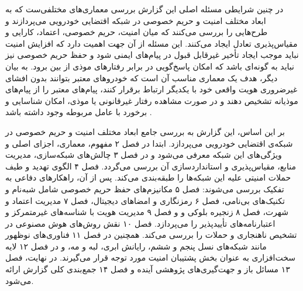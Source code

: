 در چنین شرایطی مسئله اصلی این گزارش بررسی معماری‌های مختلفی‌ست که به ابعاد مختلف امنیت و حریم خصوصی در شبکه اقتضایی خودرویی می‌پردازند و طرح‌هایی را بررسی می‌کنند که میان امنیت، حریم خصوصی، اعتماد، کارایی و مقیاس‌پذیری تعادل ایجاد می‌کنند. این مسئله از آن جهت اهمیت دارد که افزایش امنیت نباید موجب ایجاد تأخیر غیرقابل قبول در پیام‌های ایمنی شود و حفظ حریم خصوصی نیز نباید به گونه‌ای باشد که امکان پاسخ‌گویی در برابر رفتارهای موذی از بین برود. به بیان دیگر، هدف یک معماری مناسب آن است که خودروهای معتبر بتوانند بدون افشای غیرضروری هویت واقعی خود با یکدیگر ارتباط برقرار کنند، پیام‌های معتبر را از پیام‌های موذیانه تشخیص دهند و در صورت مشاهده رفتار غیرقانونی یا موذی، امکان شناسایی و برخورد با عامل مربوطه وجود داشته باشد \cite{rahmawatiagustinaSystematicLiteratureReview2025,VanetSecurityPrivacy}.

بر این اساس، این گزارش به بررسی جامع ابعاد مختلف امنیت و حریم خصوصی در شبکه‌ی اقتضایی خودرویی می‌پردازد. ابتدا در فصل ۲ مفهوم، معماری، اجزای اصلی و ویژگی‌های این شبکه معرفی می‌شود و در فصل ۳ چالش‌های شبکه‌سازی، مدیریت منابع، مقیاس‌پذیری و استانداردسازی آن بررسی می‌گردد. فصل ۴ الگوی تهدید و طیف حملات امنیتی علیه این شبکه‌ها را طبقه‌بندی می‌کند. پس از آن، راهکارهای دفاعی به تفکیک بررسی می‌شوند: فصل ۵ مکانیزم‌های حفظ حریم خصوصی شامل شبه‌نام و تکنیک‌های بی‌نامی، فصل ۶ رمزنگاری و امضاهای دیجیتال، فصل ۷ مدیریت اعتماد و شهرت، فصل ۸ زنجیره بلوکی و  و فصل ۹ مدیریت هویت با شناسه‌های غیرمتمرکز و اعتبارنامه‌های تأییدپذیر را می‌پردازد. فصل ۱۰ نقش روش‌های هوش مصنوعی در تشخیص ناهنجاری و حملات را بررسی می‌کند. همچنین در فصل ۱۱ فناوری‌های نوظهور مانند شبکه‌های نسل پنجم و ششم، رایانش ابری، لبه و مه، و در فصل ۱۲ لایه سخت‌افزاری به عنوان بخش پشتیبان امنیت مورد توجه قرار می‌گیرند. در نهایت، فصل ۱۳ مسائل باز و جهت‌گیری‌های پژوهشی آینده و فصل ۱۴ جمع‌بندی کلی گزارش ارائه می‌شود.
